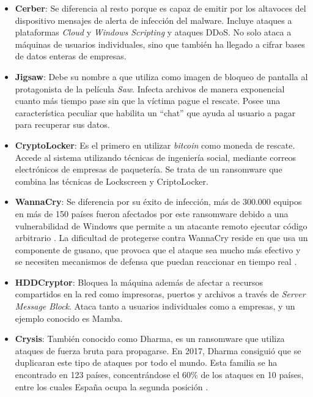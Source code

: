 \begin{itemize}
    \item \textbf{Cerber}: Se diferencia al resto porque es capaz de emitir por los altavoces del dispositivo mensajes de alerta de infección del malware. Incluye ataques a plataformas \textit{Cloud} y \textit{Windows Scripting} y ataques \gls{DDoS}. No solo ataca a máquinas de usuarios individuales, sino que también ha llegado a cifrar bases de datos enteras de empresas.
    
    \item \textbf{Jigsaw}: Debe su nombre a que utiliza como imagen de bloqueo de pantalla al protagonista de la película \textit{Saw}. Infecta archivos de manera exponencial cuanto más tiempo pase sin que la víctima pague el rescate. 
    Posee una característica peculiar que habilita un ``chat'' que ayuda al usuario a pagar para recuperar sus datos.
    
    \item \textbf{CryptoLocker}: Es el primero en utilizar \textit{bitcoin} como moneda de rescate. Accede al sistema utilizando técnicas de ingeniería social, mediante correos electrónicos de empresas de paquetería. Se trata de un ransomware que combina las técnicas de Lockscreen y CriptoLocker.
    
    \item \textbf{WannaCry}: Se diferencia por su éxito de infección, más de 300.000 equipos en más de 150 países fueron afectados por este ransomware debido a una vulnerabilidad de Windows que permite a un atacante remoto ejecutar código arbitrario \cite{exploit}. La dificultad de protegerse contra WannaCry reside en que usa un componente de gusano, que provoca que el ataque sea mucho más efectivo y se necesiten mecanismos de defensa que puedan reaccionar en tiempo real \cite{Akbanov2019}.
 
    \item \textbf{HDDCryptor}: Bloquea la máquina además de afectar a recursos compartidos en la red como impresoras, puertos y archivos a través de \textit{Server Message Block}. Ataca tanto a usuarios individuales como a empresas, y un ejemplo conocido es Mamba.
    
    \item \textbf{Crysis}: También conocido como Dharma, es un ransomware que utiliza ataques de fuerza bruta para propagarse. En 2017, Dharma consiguió que se duplicaran este tipo de ataques por todo el mundo. Esta familia se ha encontrado en 123 países, concentrándose el 60\% de los ataques en 10 países, entre los cuales España ocupa la segunda posición \cite{CcnCert}. 
    
\end{itemize}

